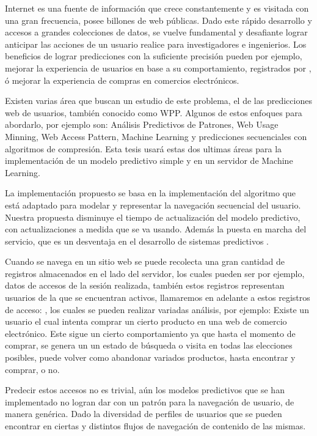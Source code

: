 %
%
%
Internet es una fuente de información que crece constantemente y es visitada con una gran frecuencia, posee billones de web públicas. Dado este rápido desarrollo y accesos a grandes colecciones de datos, se vuelve fundamental y desafiante lograr anticipar las acciones de un usuario realice para investigadores e ingenierios. Los beneficios de lograr predicciones con la suficiente precisión pueden por ejemplo, mejorar la experiencia de usuarios en base a su comportamiento, registrados por \webasccesslog, ó mejorar la experiencia de compras en comercios electrónicos.

Existen varias área que buscan un estudio de este problema, el de las predicciones web de usuarios, también conocido como WPP. Algunos de estos enfoques para  abordarlo, por ejemplo son:  Análisis Predictivos de Patrones, Web Usage Minning, Web Access Pattern, Machine Learning y predicciones secuenciales con algoritmos de compresión. Esta tesis usará estas dos ultimas áreas para la implementación de un modelo predictivo simple y en un servidor de Machine Learning.

La implementación  propuesto se basa en la implementación del algoritmo \lzSieteOcho que está adaptado para modelar y representar la navegación secuencial del usuario. Nuestra propuesta disminuye el tiempo de actualización del modelo predictivo, con actualizaciones a medida que se va usando. Además la puesta en marcha del servicio, que es un desventaja en el desarrollo de sistemas predictivos \online.


Cuando se navega en un sitio web se puede recolecta una gran cantidad de registros almacenados en el lado del servidor, los cuales pueden ser por ejemplo, datos de accesos de la sesión realizada, también estos  registros representan usuarios de la \web  que se encuentran activos, llamaremos en adelante a estos registros de acceso: \webasccesslog,   los cuales se pueden realizar variadas análisis, por ejemplo:  Existe un usuario el cual intenta comprar un cierto producto en una web de comercio electrónico. Este sigue un cierto comportamiento ya que hasta el momento de comprar, se genera un un estado de búsqueda o visita en todas las elecciones posibles, puede volver como abandonar variados productos, hasta encontrar y comprar, o no. 

Predecir estos  accesos no es trivial, aún los modelos predictivos que se han implementado no logran dar con un patrón para la navegación de usuario, de manera genérica. Dado la diversidad de perfiles de usuarios que se pueden encontrar en ciertas \webs  y distintos flujos de navegación de contenido de las mismas.  

